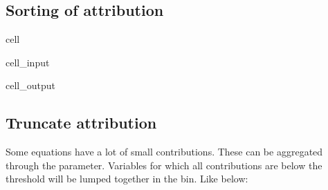 \documentclass[letterpaper,10pt,english]{jupyterBook}
\begin{document}
\subsection{Sorting of attribution}
\label{\detokenize{content/howto/attribution/Attribution background:sorting-of-attribution}}
\begin{sphinxuseclass}{cell}\begin{sphinxVerbatimInput}

\begin{sphinxuseclass}{cell_input}
\begin{sphinxVerbatim}[commandchars=\\\{\}]
\end{sphinxVerbatim}

\end{sphinxuseclass}\end{sphinxVerbatimInput}
\begin{sphinxVerbatimOutput}

\begin{sphinxuseclass}{cell_output}
\noindent{}

\end{sphinxuseclass}\end{sphinxVerbatimOutput}

\end{sphinxuseclass}

\subsection{Truncate attribution}
\label{\detokenize{content/howto/attribution/Attribution background:truncate-attribution}}
\sphinxAtStartPar
Some equations have a lot of small contributions. These can be aggregated through the  parameter.
Variables for which all contributions are below the threshold will be lumped together in the  bin. Like below:
\end{document}
